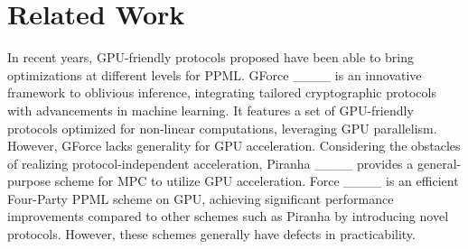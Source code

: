 \section{Related Work}
In recent years, GPU-friendly protocols proposed have been able to bring optimizations at different levels for PPML.
GForce ____ is an innovative framework to oblivious inference, integrating tailored cryptographic protocols with advancements in machine learning. It features a set of GPU-friendly protocols optimized for non-linear computations, leveraging GPU parallelism. However, GForce lacks generality for GPU acceleration. 
Considering the obstacles of realizing protocol-independent acceleration, Piranha ____ provides a general-purpose scheme for MPC to utilize GPU acceleration.
Force ____ is an efficient Four-Party PPML scheme on GPU, achieving significant performance improvements compared to other schemes such as Piranha by introducing novel protocols.
However, these schemes generally have defects in practicability.